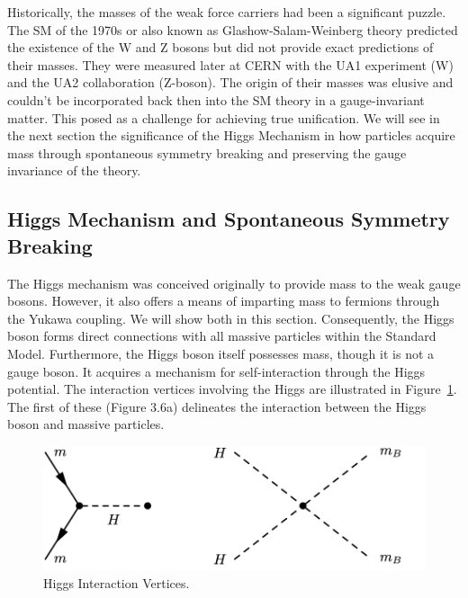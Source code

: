 Historically, the masses of the weak force carriers had been a significant puzzle. The SM of the 1970s or also known as Glashow-Salam-Weinberg theory predicted the existence of the W and Z bosons but did not provide exact predictions of their masses. They were measured later at CERN with the UA1 experiment (W) and the UA2 collaboration (Z-boson). The origin of their masses was elusive and couldn't be incorporated back then into the SM theory in a gauge-invariant matter. This posed as a challenge for achieving true unification. We will see in the next section the significance of the Higgs Mechanism in how particles acquire mass through spontaneous symmetry breaking and preserving the gauge invariance of the theory.




\subsection{Higgs Mechanism and Spontaneous Symmetry Breaking} \label{sec:HiggsMechanism}

The Higgs mechanism was conceived originally to provide mass to the weak gauge bosons. However, it also offers a means of imparting mass to fermions through the Yukawa coupling. We will show both in this section. Consequently, the Higgs boson forms direct connections with all massive particles within the Standard Model. Furthermore, the Higgs boson itself possesses mass, though it is not a gauge boson. It acquires a mechanism for self-interaction through the Higgs potential. The interaction vertices involving the Higgs are illustrated in Figure~\ref{fig:HiggsVertices}. The first of these (Figure 3.6a) delineates the interaction between the Higgs boson and massive particles. 

\begin{figure}[!htbp]
	\centering
    \label{fig:HiggsVertices}
    \caption{Higgs Interaction Vertices.}
    \includegraphics[scale=1.0]{fig/HiggsInteraction.png}
\end{figure}

